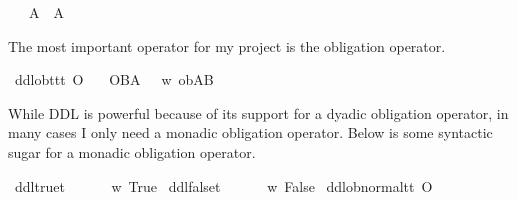 \begin{isabellebody}
\ \ \ {\isachardoublequoteopen}{\isasymdiamond}A\ {\isasymequiv}\ \isactrlbold {\isasymnot}{\isacharparenleft}{\isasymbox}{\isacharparenleft}\isactrlbold {\isasymnot}A{\isacharparenright}{\isacharparenright}{\isachardoublequoteclose}%
\begin{isamarkuptext}%
The most important operator for my project is the obligation operator.%
\end{isamarkuptext}\isamarkuptrue%
\isamarkupfalse%
\ ddlob{\isacharcolon}{\isacharcolon}{\isachardoublequoteopen}t{\isasymRightarrow}t{\isasymRightarrow}t{\isachardoublequoteclose}\ {\isacharparenleft}{\isachardoublequoteopen}O{\isacharbraceleft}{\isacharunderscore}{\isacharbar}{\isacharunderscore}{\isacharbraceright}{\isachardoublequoteclose}{\isacharparenright}\isanewline
\ \ \ {\isachardoublequoteopen}O{\isacharbraceleft}B{\isacharbar}A{\isacharbraceright}\ {\isasymequiv}\ {\isasymlambda}\ w{\isachardot}\ ob{\isacharparenleft}A{\isacharparenright}{\isacharparenleft}B{\isacharparenright}{\isachardoublequoteclose}\isanewline
%
\isanewline
%
\begin{isamarkuptext}%
While DDL is powerful because of its support for a dyadic obligation operator, in many cases 
I only need a monadic obligation operator. Below is some syntactic sugar for a monadic obligation operator.%
\end{isamarkuptext}\isamarkuptrue%
\isamarkupfalse%
\ ddltrue{\isacharcolon}{\isacharcolon}{\isachardoublequoteopen}t{\isachardoublequoteclose}\ {\isacharparenleft}{\isachardoublequoteopen}\isactrlbold {\isasymtop}{\isachardoublequoteclose}{\isacharparenright}\isanewline
\ \ \ {\isachardoublequoteopen}\isactrlbold {\isasymtop}\ {\isasymequiv}\ {\isasymlambda}w{\isachardot}\ True{\isachardoublequoteclose}\isanewline
{}\isamarkupfalse%
\ ddlfalse{\isacharcolon}{\isacharcolon}{\isachardoublequoteopen}t{\isachardoublequoteclose}\ {\isacharparenleft}{\isachardoublequoteopen}\isactrlbold {\isasymbottom}{\isachardoublequoteclose}{\isacharparenright}\isanewline
\ \ \ {\isachardoublequoteopen}\isactrlbold {\isasymbottom}\ {\isasymequiv}\ {\isasymlambda}w{\isachardot}\ False{\isachardoublequoteclose}\isanewline
{}\isamarkupfalse%
\ ddlob{\isacharunderscore}normal{\isacharcolon}{\isacharcolon}{\isachardoublequoteopen}t{\isasymRightarrow}t{\isachardoublequoteclose}\ {\isacharparenleft}{\isachardoublequoteopen}O\ {\isacharbraceleft}{\isacharunderscore}{\isacharbraceright}{\isachardoublequoteclose}{\isacharparenright}\isanewline

\end{isabellebody}
